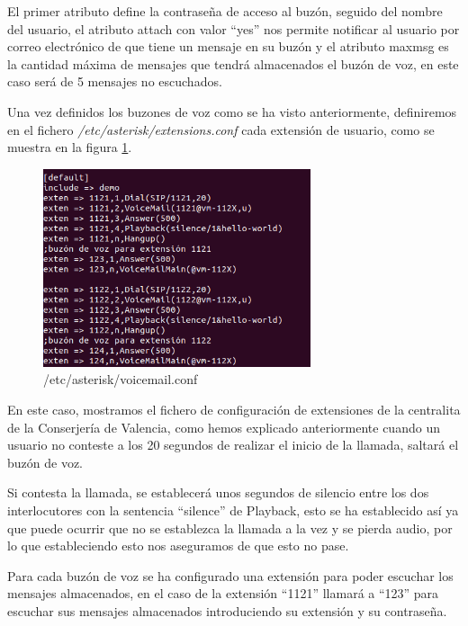 \documentclass[a4paper]{article}
\begin{document}
 El primer atributo define la contraseña de acceso al buzón, seguido del nombre del usuario, el atributo attach con valor ``yes'' nos permite notificar al usuario por correo electrónico de que tiene un mensaje en su buzón y el atributo maxmsg es la cantidad máxima de mensajes que tendrá almacenados el buzón de voz, en este caso será de 5 mensajes no escuchados.


 Una vez definidos los buzones de voz como se ha visto anteriormente, definiremos en el fichero \textit{/etc/asterisk/extensions.conf} cada extensión de usuario, como se muestra en la figura \ref{fig:extensions.conf}.

\newpage
\begin{figure}
    \begin{center}
        \includegraphics[width=0.7\textwidth]{extens+buzon.png}
         \caption{/etc/asterisk/voicemail.conf}
         \label{fig:extensions.conf}
    \end{center}
\end{figure}

En este caso, mostramos el fichero de configuración de extensiones de la centralita de la Conserjería de Valencia, como hemos explicado anteriormente cuando un usuario no conteste a los 20 segundos de realizar el inicio de la llamada, saltará el buzón de voz. 

  Si contesta la llamada, se establecerá unos segundos de silencio entre los dos interlocutores con la sentencia ``silence'' de Playback, esto se ha establecido así ya que puede ocurrir que no se establezca la llamada a la vez y se pierda audio, por lo que estableciendo esto nos aseguramos de que esto no pase.

 
Para cada buzón de voz se ha configurado una extensión para poder escuchar los mensajes almacenados, en el caso de la extensión ``1121'' llamará a ``123'' para escuchar sus mensajes almacenados introduciendo su extensión y su contraseña.
\end{document}
